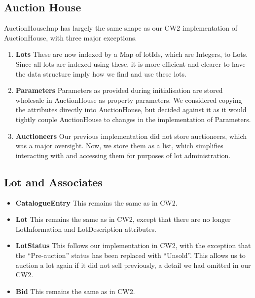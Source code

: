 \documentclass[titlepage, 12pt]{extarticle}
\begin{document}
\subsection{Auction House}
AuctionHouseImp has largely the same shape as
our CW2 implementation of AuctionHouse, with three major exceptions.
        \begin{enumerate}
            \item {\bf Lots} These are now indexed by a Map of lotIds, which are
                Integers, to Lots. Since all lots are indexed using these, it is
                more efficient and clearer to have the data structure imply how
                we find and use these lots.
            \item {\bf Parameters} Parameters as provided during initialisation
                are stored wholesale in AuctionHouse as property parameters. We
                considered copying the attributes directly into AuctionHouse,
                but decided against it as it would tightly couple AuctionHouse
                to changes in the implementation of Parameters.
            \item {\bf Auctioneers} Our previous implementation did not store
                auctioneers, which was a major oversight. Now, we store them as
                a list, which simplifies interacting with and accessing them for
                purposes of lot administration.
        \end{enumerate}
\subsection{Lot and Associates}
\begin{itemize}
    \item {\bf CatalogueEntry} This remains the same as in CW2.
    \item {\bf Lot} This remains the same as in CW2, except that there are no
        longer LotInformation and LotDescription attributes. 
    \item {\bf LotStatus} This follows our implementation in CW2, with the
        exception that the ``Pre-auction'' status has been replaced with
        ``Unsold''. This allows us to auction a lot again if it did not sell
        previously, a detail we had omitted in our CW2. 
    \item {\bf Bid} This remains the same as in CW2.
\end{itemize}
\end{document}
